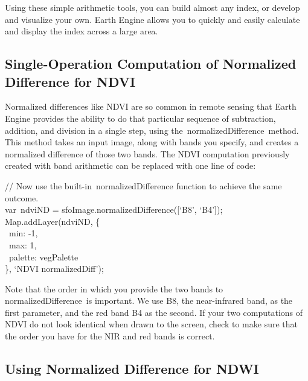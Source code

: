 \documentclass[
  letterpaper,
  DIV=11,
  numbers=noendperiod]{scrreprt}
\begin{document}
Using these simple arithmetic tools, you can build almost any index, or
develop and visualize your own. Earth Engine allows you to quickly and
easily calculate and display the index across a large area.

\hypertarget{single-operation-computation-of-normalized-difference-for-ndvi}{%
\subsection{Single-Operation Computation of Normalized Difference for
NDVI}\label{single-operation-computation-of-normalized-difference-for-ndvi}}

Normalized differences like NDVI are so common in remote sensing that
Earth Engine provides the ability to do that particular sequence of
subtraction, addition, and division in a single step, using
the~normalizedDifference~method. This method takes an input image, along
with bands you specify, and creates a normalized difference of those two
bands. The NDVI computation previously created with band arithmetic can
be replaced with one line of code:

// Now use the built-in~normalizedDifference function to achieve the
same outcome.\\
var~ndviND = sfoImage.normalizedDifference({[}`B8', `B4'{]});\\
Map.addLayer(ndviND, \{\\
\hspace*{0.333em} ~min: -1,\\
\hspace*{0.333em} ~max: 1,\\
\hspace*{0.333em} ~palette: vegPalette\\
\}, `NDVI normalizedDiff');

Note that the order in which you provide the two bands to
normalizedDifference~is important. We use B8, the near-infrared band, as
the first parameter, and the red band B4 as the second. If your two
computations of NDVI do not look identical when drawn to the screen,
check to make sure that the order you have for the NIR and red bands is
correct.

\hypertarget{using-normalized-difference-for-ndwi}{%
\subsection{Using Normalized Difference for
NDWI}\label{using-normalized-difference-for-ndwi}}
\end{document}

